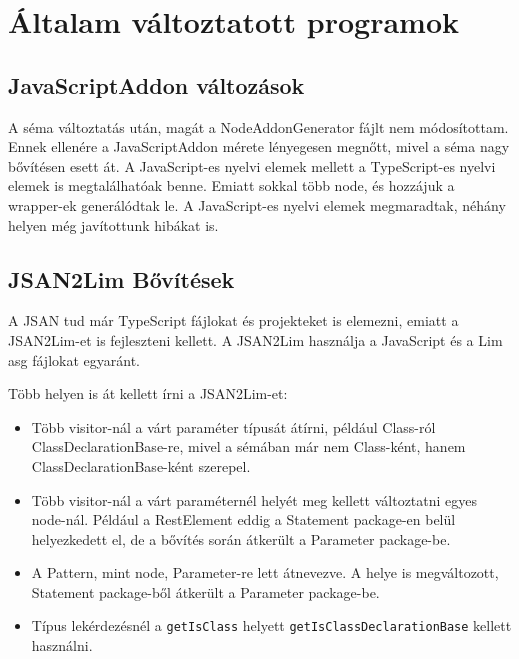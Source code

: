 \chapter{Általam változtatott programok}\label{chap:altalam_valtoztatott_programok}

\section{JavaScriptAddon változások}

\noindent


A séma változtatás után, magát a NodeAddonGenerator fájlt nem módosítottam.
Ennek ellenére a JavaScriptAddon mérete lényegesen megnőtt, mivel a séma nagy bővítésen esett át.
A JavaScript-es nyelvi elemek mellett a TypeScript-es nyelvi elemek is megtalálhatóak benne.
Emiatt sokkal több node, és hozzájuk a wrapper-ek generálódtak le.
A JavaScript-es nyelvi elemek megmaradtak, néhány helyen még javítottunk hibákat is.

\section{JSAN2Lim Bővítések}

\noindent

A JSAN tud már TypeScript fájlokat és projekteket is elemezni, emiatt a JSAN2Lim-et is fejleszteni kellett.
A JSAN2Lim használja a JavaScript és a Lim asg fájlokat egyaránt.

Több helyen is át kellett írni a JSAN2Lim-et:
\begin{itemize}
      \item Több visitor-nál a várt paraméter típusát átírni, például Class-ról ClassDeclarationBase-re, mivel a sémában már nem Class-ként, hanem ClassDeclarationBase-ként szerepel.
      \item Több visitor-nál a várt paraméternél helyét meg kellett változtatni egyes node-nál.
      Például a RestElement eddig a Statement package-en belül helyezkedett el, de a bővítés során átkerült a Parameter package-be.
      \item A Pattern, mint node, Parameter-re lett átnevezve. A helye is megváltozott, Statement package-ből átkerült a Parameter package-be.
      \item Típus lekérdezésnél a \texttt{getIsClass} helyett \texttt{getIsClassDeclarationBase} kellett használni.
\end{itemize}

